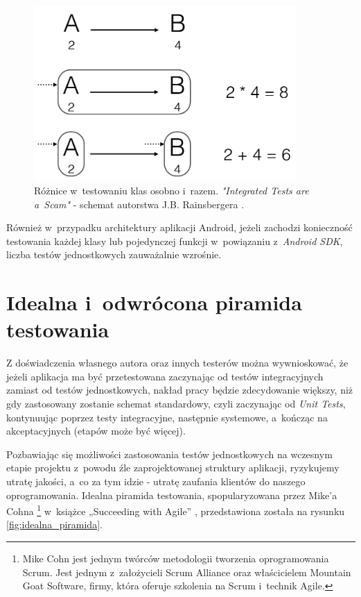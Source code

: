 \begin{figure}[!htb]
    \centering
    \includegraphics[width=10cm]{imgs/ch3_przyklad_testowania_klas_pl.png}
    \caption
{Różnice w~testowaniu klas osobno i~razem. \textit{"Integrated Tests are a~Scam"} - schemat autorstwa J.B. Rainsbergera \cite{website:android:testowanieklas}.}
    \label{fig:testowanie_klas}
\end{figure} 

Również w~przypadku architektury aplikacji Android, jeżeli zachodzi konieczność testowania każdej klasy lub pojedynczej funkcji w~powiązaniu z~\textit{Android SDK}, liczba testów jednostkowych zauważalnie wzrośnie.

\section{Idealna i~odwrócona piramida testowania}
\label{piramida_testowania}
Z doświadczenia własnego autora oraz innych testerów można wywnioskować, że jeżeli aplikacja ma być przetestowana zaczynając od testów integracyjnych zamiast od testów jednostkowych, nakład pracy będzie zdecydowanie większy, niż gdy zastosowany zostanie schemat standardowy, czyli zaczynając od \textit{Unit Tests}, kontynuując poprzez testy integracyjne, następnie systemowe, a~kończąc na akceptacyjnych (etapów może być więcej). 

Pozbawiając się możliwości zastosowania testów jednostkowych na wczesnym etapie projektu z~powodu źle zaprojektowanej struktury aplikacji, ryzykujemy utratę jakości, a~co za tym idzie - utratę zaufania klientów do naszego oprogramowania. Idealna piramida testowania, spopularyzowana przez Mike’a Cohna \footnote{Mike Cohn jest jednym twórców metodologii tworzenia oprogramowania Scrum. Jest jednym z~założycieli Scrum Alliance oraz właścicielem Mountain Goat Software, firmy, która oferuje szkolenia na Scrum i~technik Agile.}  w~książce „Succeeding with Agile” \cite{bib:cohn:agile}, przedstawiona została na rysunku \ref{fig:idealna_piramida}.

